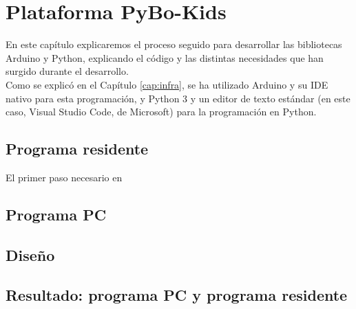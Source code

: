 \chapter{Plataforma PyBo-Kids}
\label{cap:PyBoKids}
En este capítulo explicaremos el proceso seguido para desarrollar las bibliotecas Arduino y Python, explicando el código y las distintas necesidades que han surgido durante el desarrollo. \\
Como se explicó en el Capítulo \ref{cap:infra}, se ha utilizado Arduino  y su IDE nativo para esta programación, y Python 3 y un editor de texto estándar (en este caso, Visual Studio Code, de Microsoft) para la programación en Python. 


\section{Programa residente}\label{sec:residente}
El primer paso necesario en 
\section{Programa PC}
\section{Diseño}\label{sec:diseño}
\section{Resultado: programa PC y programa residente}\label{resultado}